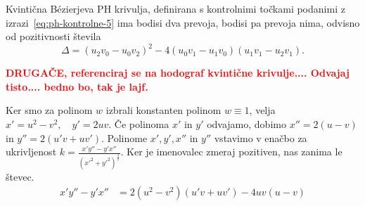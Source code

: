 \documentclass[isrm2, tisk]{fmfdelo}
\newcommand{\mycomment}[1]{\textbf{\textcolor{red}{#1}}}
\begin{document}
    \begin{lema}
        Kvintična Bézierjeva PH krivulja, definirana s kontrolnimi točkami podanimi z izrazi~\eqref{eq:ph-kontrolne-5} ima bodisi dva prevoja, bodisi pa prevoja nima, odvisno od pozitivnosti števila \[\Delta = (u_2v_0-u_0v_2)^2 - 4(u_0v_1-u_1v_0)(u_1v_1-u_2v_1).\]
    \end{lema}

    \begin{dokaz}
        \mycomment{DRUGAČE, referenciraj se na hodograf kvintične krivulje.... Odvajaj tisto.... bedno bo, tak je lajf.}


        Ker smo za polinom $w$ izbrali konstanten polinom $w\equiv1$, velja $x'=u^2-v^2,\quad y'=2uv$.
        Če polinoma $x'$ in $y'$ odvajamo, dobimo $x'' = 2(u-v)$ in $y'' = 2(u'v+uv')$.
        Polinome $x',y',x''$ in $y''$ vstavimo v enačbo za ukrivljenost $k=\frac{x'y''-y'x''}{(x'^2+y'^2)^{\frac{3}{2}}}$.
        Ker je imenovalec zmeraj pozitiven, nas zanima le števec.
        \begin{align*}
            x'y''-y'x'' &= 2(u^2-v^2)(u'v+uv') - 4uv(u-v)
        \end{align*}

    \end{dokaz}
\end{document}
